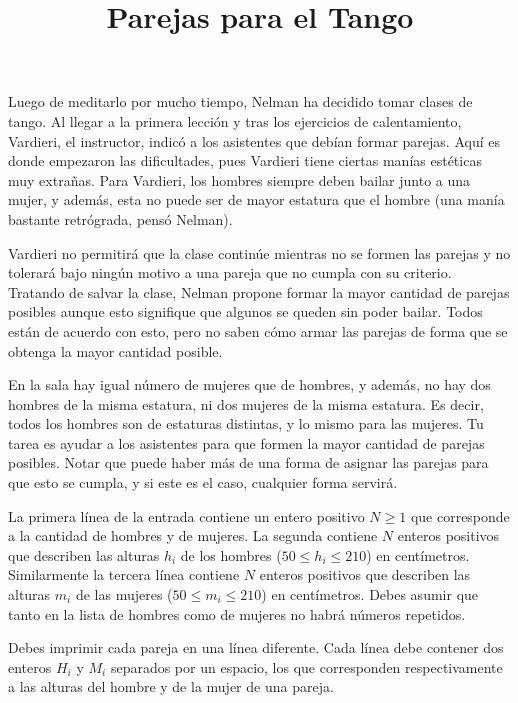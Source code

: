 \documentclass{oci}
\title{Parejas para el Tango}
\begin{document}
\begin{problemDescription}
Luego de meditarlo por mucho tiempo, Nelman ha decidido tomar clases de tango.
Al llegar a la primera lección y tras los ejercicios de calentamiento, Vardieri, el instructor, indicó a los asistentes que debían formar parejas.
Aquí es donde empezaron las dificultades, pues Vardieri tiene ciertas manías estéticas muy extrañas.
Para Vardieri, los hombres siempre deben bailar junto a una mujer, y además, esta no puede ser de mayor estatura que el hombre (una manía bastante retrógrada, pensó Nelman).

Vardieri no permitirá que la clase continúe mientras no se formen las parejas y no tolerará bajo ningún motivo a una pareja que no cumpla con su criterio.
Tratando de salvar la clase, Nelman propone formar la mayor cantidad de parejas posibles aunque esto signifique que algunos se queden sin poder bailar.
Todos están de acuerdo con esto, pero no saben cómo armar las parejas de forma que se obtenga la mayor cantidad posible.

En la sala hay igual número de mujeres que de hombres, y además, no hay dos hombres de la misma estatura, ni dos mujeres de la misma estatura.
Es decir, todos los hombres son de estaturas distintas, y lo mismo para las mujeres.
Tu tarea es ayudar a los asistentes para que formen la mayor cantidad de parejas posibles.
Notar que puede haber más de una forma de asignar las parejas para que esto se cumpla, y si este es el caso, cualquier forma servirá.

\end{problemDescription}

\begin{inputDescription}
La primera línea de la entrada contiene un entero positivo $N \geq 1$ que corresponde a la cantidad de hombres y de mujeres.
La segunda contiene $N$ enteros positivos que describen las alturas $h_i$ de los hombres ($50 \leq h_i \leq 210$) en centímetros.
Similarmente la tercera línea contiene $N$ enteros positivos que describen las alturas $m_i$ de las mujeres ($50 \le m_i \le 210$) en centímetros.
Debes asumir que tanto en la lista de hombres como de mujeres no habrá números repetidos.
\end{inputDescription}

\begin{outputDescription}
Debes imprimir cada pareja en una línea diferente.
Cada línea debe contener dos enteros $H_i$ y $M_i$ separados por un espacio, los que corresponden respectivamente a las alturas del hombre y de la mujer de una pareja.
\end{outputDescription}
\end{document}
